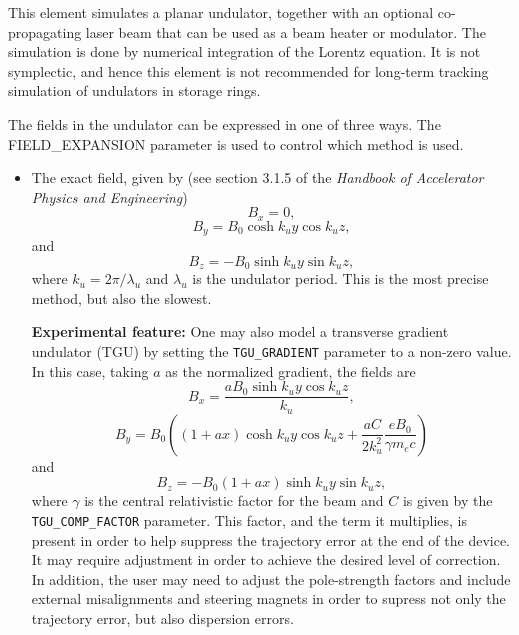 This element simulates a planar undulator, together with an optional
co-propagating laser beam that can be used as a beam heater or
modulator.  The simulation is done by numerical integration of the
Lorentz equation.  It is not symplectic, and hence this element is not
recommended for long-term tracking simulation of undulators in storage
rings.  

The fields in the undulator can be expressed in one of three ways.
The FIELD\_EXPANSION parameter is used to control which method is used.
\begin{itemize}
\item The exact field, given by (see section 3.1.5 of the {\em Handbook of
Accelerator Physics and Engineering})
\begin{equation}
B_x = 0,
\end{equation}
\begin{equation}
B_y = B_0 \cosh k_u y \cos k_u z,
\end{equation}
and
\begin{equation}
B_z = -B_0 \sinh k_u y \sin k_u z ,
\end{equation}
where $k_u = 2\pi/\lambda_u$ and $\lambda_u$ is the undulator period.
This is the most precise method, but also the slowest.  

{\bf Experimental feature:} One may also model a transverse gradient undulator (TGU) by setting the \verb|TGU_GRADIENT| parameter
to a non-zero value.
In this case, taking $a$ as the normalized gradient, the fields are \cite{RLindbergPC}
\begin{equation}
B_x = \frac{a B_0 \sinh k_u y \cos k_u z}{k_u},
\end{equation}
\begin{equation}
B_y = B_0 \left((1 + a x) \cosh k_u y \cos k_u z + \frac{a C }{2 k_u^2}\frac{e B_0}{\gamma m_e c }\right)
\end{equation}
and
\begin{equation}
B_z = -B_0 (1 + a x) \sinh k_u y \sin k_u z,
\end{equation}
where $\gamma$ is the central relativistic factor for the beam and $C$ is given by the
\verb|TGU_COMP_FACTOR| parameter.
This factor, and the term it multiplies, is present in order to help suppress the 
trajectory error at the end of the device.
It may require adjustment in order to achieve the desired level of correction.
In addition, the user may need to adjust the pole-strength factors and include external misalignments
and steering magnets in order to supress not only the trajectory error, but also dispersion errors.


\end{itemize}
